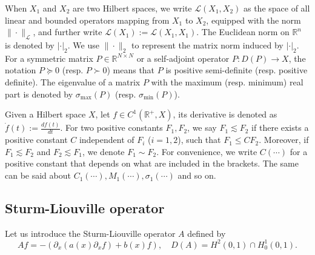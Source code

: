 \documentclass[review]{elsarticle}
\numberwithin{equation}{section}
\begin{document}
 When  $X_1$ and $X_2$ are two Hilbert spaces, we write
    $\mathcal{L}(X_1,X_2)$ as the space of all linear and bounded operators mapping from $X_1$ to $X_2$, equipped with the norm $\|\cdot\|_{\mathcal{L}}$, and further
    write  $\mathcal{L}(X_1):=\mathcal{L}(X_1,X_1)$. 
    The Euclidean norm on $\mathbb{R}^n$ is denoted by $|\cdot|_2$. We use $\|\cdot\|_2$ to represent the matrix norm induced by $|\cdot|_2$. For a symmetric matrix $P\in\mathbb{R}^{N\times N}$ or a self-adjoint operator $P:D(P)\to X$, the notation $ P\succeq 0$ (resp. $P\succ0$) means that $P$ is positive semi-definite (resp. positive definite). The eigenvalue of a matrix $P$ with the maximum (resp. minimum) real part is denoted by $\sigma_{\max}(P)$ (resp. $\sigma_{\min}(P)$).
   
   Given a Hilbert space $X$, let {$f\in C^1(\mathbb{R}^+,X)$, its derivative is denoted as $\dot{f}(t):=\frac{df(t)}{dt}$}. For two positive constants $F_1,F_2$, we say $F_1\lesssim F_2$ if there exists a positive constant $C$ independent of $F_i$ ($i=1,2$), such that $F_1\le CF_2$. Moreover, if $F_1\lesssim F_2$ and $F_2 \lesssim F_1$, we denote $F_1\sim F_2$. For convenience, we write $C\left(\cdots\right)$ for a positive constant that depends on what are included in the brackets. The same can be said about $C_1\left(\cdots\right),M_1\left(\cdots\right),\sigma_1\left(\cdots\right)$ and so on.
   


\subsection{Sturm-Liouville operator}
	
Let us introduce the Sturm-Liouville operator $A$ defined by
\begin{equation*}
\label{Sturm-Liouville-1}
       Af=-(\partial_x (a(x)\partial_x f)+{b(x)}f), \quad D( A)=H^2(0,1)\cap H^1_0(0,1).
\end{equation*}
       
\end{document}
